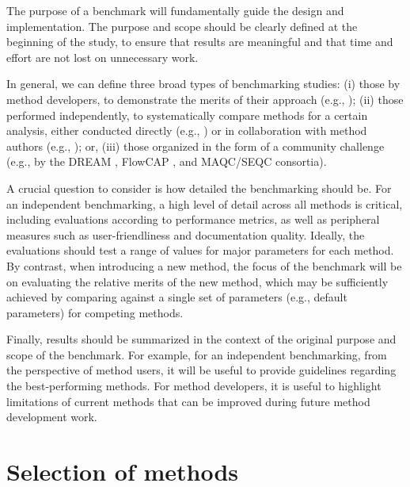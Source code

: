 \documentclass[12pt, a4paper]{article}
\begin{document}
The purpose of a benchmark will fundamentally guide the design and implementation. The purpose and scope should be clearly defined at the beginning of the study, to ensure that results are meaningful and that time and effort are not lost on unnecessary work.

In general, we can define three broad types of benchmarking studies: (i) those by method developers, to demonstrate the merits of their approach (e.g., \citep{Weber2018, Nowicka2016, Levine2015, Zhou2014, Law2014}); (ii) those performed independently, to systematically compare methods for a certain analysis, either conducted directly (e.g., \citep{Duo2018, Saelens2018a, Saelens2018b, Soneson2018, Weber2016, Baruzzo2017, Kanitz2015, Soneson2013, Rapaport2013, Dillies2012}) or in collaboration with method authors (e.g., \citep{Sage2015}); or, (iii) those organized in the form of a community challenge (e.g., by the DREAM \citep{Weirauch2013, Costello2014, Kuffner2015, Ewing2015, Hill2016}, FlowCAP \citep{Aghaeepour2013, Aghaeepour2016}, and MAQC/SEQC \citep{MAQC2006, MAQC2010, SEQCMAQCIII2014} consortia).

A crucial question to consider is how detailed the benchmarking should be. For an independent benchmarking, a high level of detail across all methods is critical, including evaluations according to performance metrics, as well as peripheral measures such as user-friendliness and documentation quality. Ideally, the evaluations should test a range of values for major parameters for each method. By contrast, when introducing a new method, the focus of the benchmark will be on evaluating the relative merits of the new method, which may be sufficiently achieved by comparing against a single set of parameters (e.g., default parameters) for competing methods.

Finally, results should be summarized in the context of the original purpose and scope of the benchmark. For example, for an independent benchmarking, from the perspective of method users, it will be useful to provide guidelines regarding the best-performing methods. For method developers, it is useful to highlight limitations of current methods that can be improved during future method development work.




\section*{Selection of methods}
\end{document}
